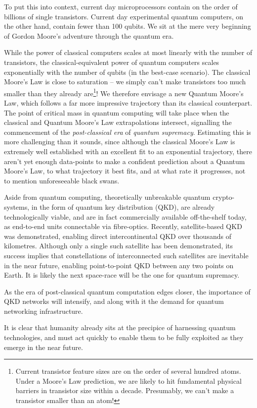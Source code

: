 To put this into context, current day microprocessors contain on the order of billions of single transistors. Current day  experimental quantum computers, on the other hand, contain fewer than 100 qubits. We sit at the mere very beginning of Gordon Moore's adventure through the quantum era.

While the power of classical computers scales at most linearly with the number of transistors, the classical-equivalent power of quantum computers scales exponentially with the number of qubits (in the best-case scenario). The classical Moore's Law is close to saturation -- we simply can't make transistors too much smaller than they already are\footnote{Current transistor feature sizes are on the order of several hundred atoms. Under a Moore's Law prediction, we are likely to hit fundamental physical barriers in transistor size within a decade. Presumably, we can't make a transistor smaller than an atom!}! We therefore envisage a new Quantum Moore's Law, which follows a far more impressive trajectory than its classical counterpart. The point of critical mass in quantum computing will take place when the classical and Quantum Moore's Law extrapolations intersect, signalling the commencement of the \textit{post-classical era} of \textit{quantum supremacy}. Estimating this is more challenging than it sounds, since although the classical Moore's Law is extremely well established with an excellent fit to an exponential trajectory, there aren't yet enough data-points to make a confident prediction about a Quantum Moore's Law, to what trajectory it best fits, and at what rate it progresses, not to mention unforeseeable black swans.

Aside from quantum computing, theoretically unbreakable quantum crypto-systems, in the form of quantum key distribution (QKD), are already technologically viable, and are in fact commercially available off-the-shelf today, as end-to-end units connectable via fibre-optics. Recently, satellite-based QKD was demonstrated, enabling direct intercontinental QKD over thousands of kilometres. Although only a single such satellite has been demonstrated, its success implies that constellations of interconnected such satellites are inevitable in the near future, enabling point-to-point QKD between any two points on Earth. It is likely the next space-race will be the one for quantum supremacy.

As the era of post-classical quantum computation edges closer, the importance of QKD networks will intensify, and along with it the demand for quantum networking infrastructure.

It is clear that humanity already sits at the precipice of harnessing quantum technologies, and must act quickly to enable them to be fully exploited as they emerge in the near future.